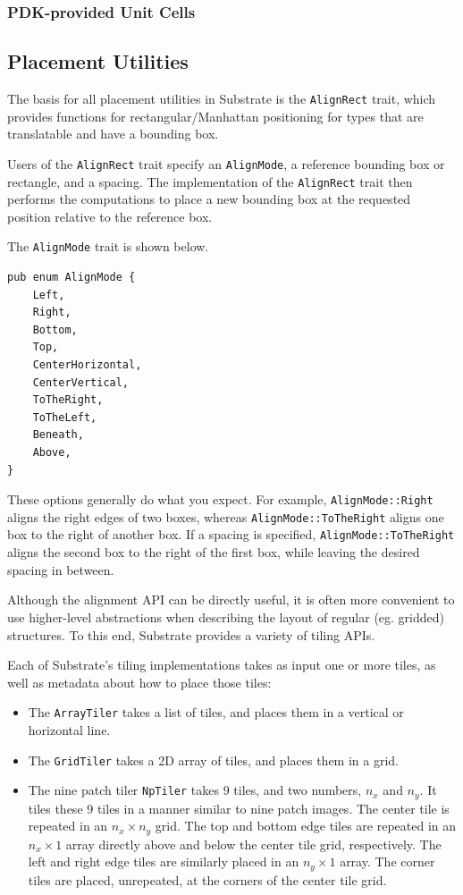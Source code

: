 \subsubsection{PDK-provided Unit Cells}

\subsection{Placement Utilities} \label{sec:placement-utilities}

The basis for all placement utilities in Substrate is the \verb|AlignRect| trait,
which provides functions for rectangular/Manhattan positioning for types
that are translatable and have a bounding box.

Users of the \verb|AlignRect| trait specify an \verb|AlignMode|, a reference bounding box or rectangle,
and a spacing. The implementation of the \verb|AlignRect| trait then performs the computations to place
a new bounding box at the requested position relative to the reference box.

The \verb|AlignMode| trait is shown below.

\begin{verbatim}
pub enum AlignMode {
    Left,
    Right,
    Bottom,
    Top,
    CenterHorizontal,
    CenterVertical,
    ToTheRight,
    ToTheLeft,
    Beneath,
    Above,
}
\end{verbatim}

These options generally do what you expect. For example, \verb|AlignMode::Right| aligns the right edges of two boxes,
whereas \verb|AlignMode::ToTheRight| aligns one box to the right of another box.
If a spacing is specified, \verb|AlignMode::ToTheRight| aligns the second box to the right of the first box,
while leaving the desired spacing in between.

Although the alignment API can be directly useful,
it is often more convenient to use higher-level abstractions
when describing the layout of regular (eg. gridded) structures.
To this end, Substrate provides a variety of tiling APIs.

Each of Substrate's tiling implementations takes as input one or more tiles,
as well as metadata about how to place those tiles:
\begin{itemize}
\item The \verb|ArrayTiler| takes a list of tiles, and places them in a vertical or horizontal line.
\item The \verb|GridTiler| takes a 2D array of tiles, and places them in a grid.
\item The nine patch tiler \verb|NpTiler| takes 9 tiles, and two numbers, $n_x$ and $n_y$.
  It tiles these 9 tiles in a manner similar to nine patch images.
  The center tile is repeated in an $n_x \times n_y$ grid.
  The top and bottom edge tiles are repeated in an $n_x \times 1$ array
  directly above and below the center tile grid, respectively.
  The left and right edge tiles are similarly placed in an $n_y \times 1$ array.
  The corner tiles are placed, unrepeated, at the corners of the center tile grid.
\end{itemize}

